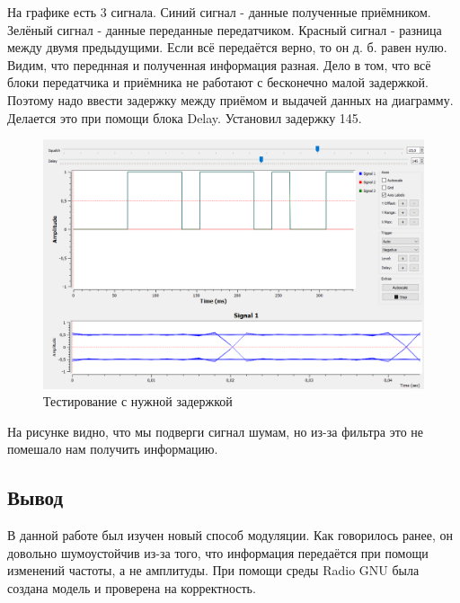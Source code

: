На графике есть 3 сигнала. Синий сигнал - данные полученные приёмником. Зелёный сигнал - данные переданные передатчиком. Красный сигнал - разница между двумя предыдущими. Если всё передаётся верно, то он д. б. равен нулю. Видим, что переднная и полученная информация разная. Дело в том, что всё блоки передатчика и приёмника не работают с бесконечно малой задержкой. Поэтому надо ввести задержку между приёмом и выдачей данных на диаграмму. Делается это при помощи блока Delay. Установил задержку 145.

    \begin{figure}[H]
	\begin{center}
		\includegraphics[scale=0.4]{fig/lab12/e2.png}
		\caption{Тестирование с нужной задержкой}
		\label{pic:e2} %
	\end{center}
\end{figure}

На рисунке видно, что мы подверги сигнал шумам, но из-за фильтра это не помешало нам получить информацию.

\subsection{Вывод}
В данной работе был изучен новый способ модуляции. Как говорилось ранее, он довольно шумоустойчив из-за того, что информация передаётся при помощи изменений частоты, а не амплитуды. При помощи среды Radio GNU была создана модель и проверена на корректность.